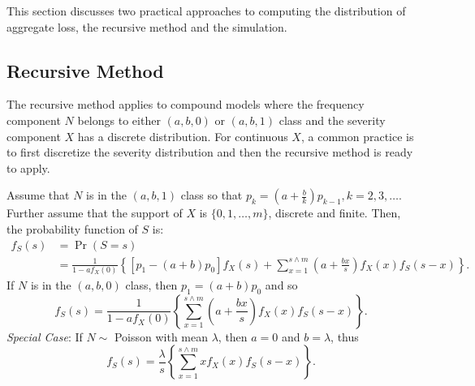 \documentclass[12pt,letterpaper]{article}
\begin{document}
This section discusses two practical approaches to computing the distribution of aggregate loss, the recursive method and the simulation.

\subsection{Recursive Method}

The recursive method applies to compound models where the frequency component $N$ belongs to either $(a,b,0)$ or $(a,b,1)$ class and the severity component $X$ has a discrete distribution. For continuous $X$, a common practice is to first discretize the severity distribution and then the recursive method is ready to apply.

Assume that $N$ is in the $(a,b,1)$ class so that $p_{k}=\left( a+\frac{b}{k} \right) p_{k-1}, k = 2,3,\ldots$. Further assume that the support of $X$ is $\{0,1,\ldots,m\}$, discrete and finite. Then, the probability function of $S$ is:
\begin{align*}
f_{S}(s)&=\Pr (S=s) \\
&=\frac{1}{1-af_{X}(0)}\left\{ \left[ p_1 -(a+b)p_{0}\right]
f_X (s)+\sum_{x=1}^{s\wedge m}\left( a+\frac{bx}{s} \right) f_X (x)f_{S}(s-x)\right\}.
\end{align*}
If $N$ is in the $(a,b,0)$ class, then $p_1=(a+b)p_0$ and so
\[
f_S(s)=\frac{1}{1-af_X (0)}\left\{ \sum_{x=1}^{s\wedge m}\left( a+\frac{bx
}{s}\right) f_X (x)f_{S}(s-x)\right\}.
\]
\textit{Special Case}: If $N \sim$ Poisson with mean $\lambda$, then $a=0$ and $b=\lambda$, thus
\[
f_{S}(s)=\frac{\lambda }{s}\left\{ \sum_{x=1}^{s \wedge
m} x f_X (x) f_S (s-x)\right\} .
\]

%
%
%
\end{document}
